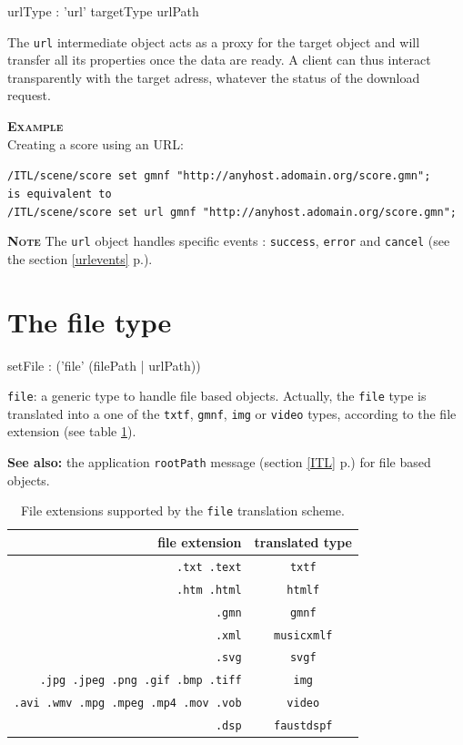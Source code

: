 \documentclass[a4paper,twoside]{report}
\newcommand{\sublevel}[1]	{\section{#1}}
\newcommand{\fullref}[1]	{\ref{#1} p.\pageref{#1}}
\newcommand{\OSC}[1]		{\texttt{#1}}
\newcommand{\example}		{\textbf{\hspace{-1.5cm}\textbf{\textsc{Example }}}}
\newcommand{\note}	[1]		{\vspace{2mm}\textbf{\hspace{-0.9cm}\textbf{\textsc{Note #1}}}}
\renewcommand{\seealso}		{\textbf{See also: }}
\let\olditemize\itemize
\let\oldenditemize\enditemize
\renewenvironment{itemize} 	{\olditemize \setlength{\itemsep}{1mm}}{\oldenditemize}
\newcommand{\sample}	[1]			{\vspace{-2mm}\begin{center}\colorbox{mygrey}{
								\begin{minipage}[t]{0.9\columnwidth} 
								{\small \texttt{#1}}
								\end{minipage}}\end{center}}
\begin{document}
\begin{rail}
urlType : 
	'url' targetType  urlPath
\end{rail}

The \OSC{url} intermediate object acts as a proxy for the target object and will transfer all its properties once the data are ready. A client can thus interact transparently with the target adress, whatever the status of the download request.

\example \\
Creating a score using an URL:
\sample{/ITL/scene/score set gmnf "http://anyhost.adomain.org/score.gmn"; \\
\hspace*{4mm} is equivalent to \\
/ITL/scene/score set url gmnf "http://anyhost.adomain.org/score.gmn";
}

\note{} The \OSC{url} object handles specific events : \OSC{success}, \OSC{error} and \OSC{cancel} (see the section \fullref{urlevents}).


\sublevel{The file type}
\label{fileset}

\label{setfile}
\begin{rail}
setFile : 
	('file' (filePath | urlPath))
\end{rail}

\begin{itemize}
\item \OSC{file}: a generic type to handle file based objects. Actually, the \OSC{file} type is translated into a one of the \OSC{txtf}, \OSC{gmnf}, \OSC{img} or \OSC{video} types, according to the file extension (see table \ref{fileTranslate}).
\end{itemize}

\seealso the application \OSC{rootPath} message (section \fullref{ITL}) for file based objects.

\begin{table}[htbp]
\caption{File extensions supported by the \OSC{file} translation scheme.}
\begin{center}
\begin{tabular}{|r|c|}
\hline
file extension & translated type \\
\hline
\OSC{.txt .text}		& \OSC{txtf} \\
\OSC{.htm .html}		& \OSC{htmlf} \\
\OSC{.gmn}			& \OSC{gmnf} \\
\OSC{.xml}			& \OSC{musicxmlf} \\
\OSC{.svg} 			& \OSC{svgf} \\
\OSC{.jpg .jpeg .png .gif .bmp .tiff} & \OSC{img} \\
\OSC{.avi .wmv .mpg .mpeg .mp4 .mov .vob} & \OSC{video} \\
\OSC{.dsp} 			& \OSC{faustdspf} \\
\hline
\end{tabular}
\end{center}
\label{fileTranslate}
\end{table}
\end{document}
